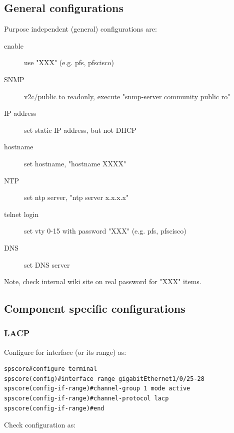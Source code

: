 \documentclass[a4paper,notitlepage]{article}
\begin{document}
\subsection{General configurations}

Purpose independent (general) configurations are:

\begin{description}
  \item[enable] use "XXX" (e.g. pfs, pfscisco)
  \item[SNMP] v2c/public to readonly, execute "snmp-server community public ro"
  \item[IP address] set static IP address, but not DHCP
  \item[hostname] set hostname, "hostname XXXX"
  \item[NTP] set ntp server, "ntp server x.x.x.x"
  \item[telnet login] set vty 0-15 with password "XXX" (e.g. pfs, pfscisco)
  \item[DNS] set DNS server
\end{description}

Note, check internal wiki site on real password for "XXX" items.

\subsection{Component specific configurations}

\subsubsection{LACP}

Configure for interface (or its range) as:

\begin{verbatim}
spscore#configure terminal 
spscore(config)#interface range gigabitEthernet1/0/25-28
spscore(config-if-range)#channel-group 1 mode active 
spscore(config-if-range)#channel-protocol lacp
spscore(config-if-range)#end
\end{verbatim}

Check configuration as:
\end{document}

